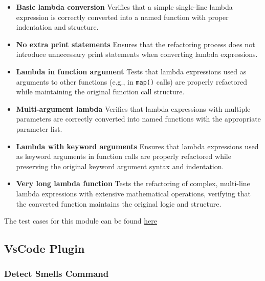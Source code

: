 \documentclass[12pt, titlepage]{article}
\begin{document}
\begin{itemize}
    \item \textbf{Basic lambda conversion} \newline
    Verifies that a simple single-line lambda expression is correctly converted into a named function with proper indentation and structure.

    \item \textbf{No extra print statements} \newline
    Ensures that the refactoring process does not introduce unnecessary print statements when converting lambda expressions.

    \item \textbf{Lambda in function argument} \newline
    Tests that lambda expressions used as arguments to other functions (e.g., in \texttt{map()} calls) are properly refactored while maintaining the original function call structure.

    \item \textbf{Multi-argument lambda} \newline
    Verifies that lambda expressions with multiple parameters are correctly converted into named functions with the appropriate parameter list.

    \item \textbf{Lambda with keyword arguments} \newline
    Ensures that lambda expressions used as keyword arguments in function calls are properly refactored while preserving the original keyword argument syntax and indentation.

    \item \textbf{Very long lambda function} \newline
    Tests the refactoring of complex, multi-line lambda expressions with extensive mathematical operations, verifying that the converted function maintains the original logic and structure.
\end{itemize}

\noindent The test cases for this module can be found \href{https://github.com/ssm-lab/capstone--source-code-optimizer/blob/new-poc/tests/refactorers/test_long_lambda_element_refactoring.py}{here}


\subsection{VsCode Plugin}

\subsubsection{Detect Smells Command}
\end{document}

